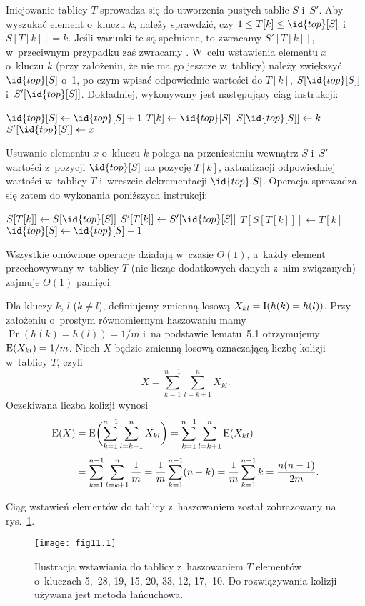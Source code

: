Inicjowanie tablicy $T$ sprowadza się do utworzenia pustych tablic $S$ i~$S'$. Aby wyszukać element o~kluczu $k$, należy sprawdzić, czy $1\le T[k]\le\id{top}[S]$ i~$S[T[k]]=k$. Jeśli warunki te są spełnione, to zwracamy $S'[T[k]]$, w~przeciwnym przypadku zaś zwracamy . W~celu wstawienia elementu $x$ o~kluczu $k$ (przy założeniu, że nie ma go jeszcze w~tablicy) należy zwiększyć $\id{top}[S]$ o~1, po czym wpisać odpowiednie wartości do $T[k]$, $S[\id{top}[S]]$ i~$S'[\id{top}[S]]$. Dokładniej, wykonywany jest następujący ciąg instrukcji:
\begin{codebox}
\zi	$\id{top}[S]\gets\id{top}[S]+1$
\zi	$T[k]\gets\id{top}[S]$
\zi	$S[\id{top}[S]]\gets k$
\zi	$S'[\id{top}[S]]\gets x$
\end{codebox}
Usuwanie elementu $x$ o~kluczu $k$ polega na przeniesieniu wewnątrz $S$ i~$S'$ wartości z~pozycji $\id{top}[S]$ na pozycję $T[k]$, aktualizacji odpowiedniej wartości w~tablicy $T$ i~wreszcie dekrementacji $\id{top}[S]$. Operacja  sprowadza się zatem do wykonania poniższych instrukcji:
\begin{codebox}
\zi	$S[T[k]]\gets S[\id{top}[S]]$
\zi	$S'[T[k]]\gets S'[\id{top}[S]]$
\zi	$T[S[T[k]]]\gets T[k]$
\zi	$\id{top}[S]\gets\id{top}[S]-1$
\end{codebox}

Wszystkie omówione operacje działają w~czasie $\Theta(1)$, a~każdy element przechowywany w~tablicy $T$ (nie licząc dodatkowych danych z~nim związanych) zajmuje $\Theta(1)$ pamięci.


\exercise %
Dla kluczy $k$, $l$ ($k\ne l$), definiujemy zmienną losową $X_{kl}=\operatorname{I}(h(k)=h(l))$. Przy założeniu o~prostym równomiernym haszowaniu mamy $\Pr(h(k)=h(l))=1/m$ i~na podstawie lematu~5.1 otrzymujemy $\operatorname{E}(X_{kl})=1/m$. Niech $X$ będzie zmienną losową oznaczającą liczbę kolizji w~tablicy $T$, czyli
\[
    X = \sum_{k=1}^{n-1}\sum_{l=k+1}^nX_{kl}.
\]
Oczekiwana liczba kolizji wynosi
\begin{align*}
	\operatorname{E}(X) &= \operatorname{E}\biggl(\sum_{k=1}^{n-1}\sum_{l=k+1}^nX_{kl}\biggr) = \sum_{k=1}^{n-1}\sum_{l=k+1}^n\operatorname{E}(X_{kl}) \\[1mm]
	&= \sum_{k=1}^{n-1}\sum_{l=k+1}^n\frac{1}{m} = \frac{1}{m}\sum_{k=1}^{n-1}(n-k) = \frac{1}{m}\sum_{k=1}^{n-1}k = \frac{n(n-1)}{2m}.
\end{align*}

\exercise %
Ciąg wstawień elementów do tablicy z~haszowaniem został zobrazowany na rys.~\ref{fig:11.2-2}.
\medskip
\begin{figure}[ht!]
	\begin{center}
		\texttt{[image: fig11.1]}
	\end{center}
	\caption{Ilustracja wstawiania do tablicy z~haszowaniem $T$ elementów o~kluczach 5,~28, 19, 15, 20, 33, 12, 17,~10. Do rozwiązywania kolizji używana jest metoda łańcuchowa.} \label{fig:11.2-2}
\end{figure}

